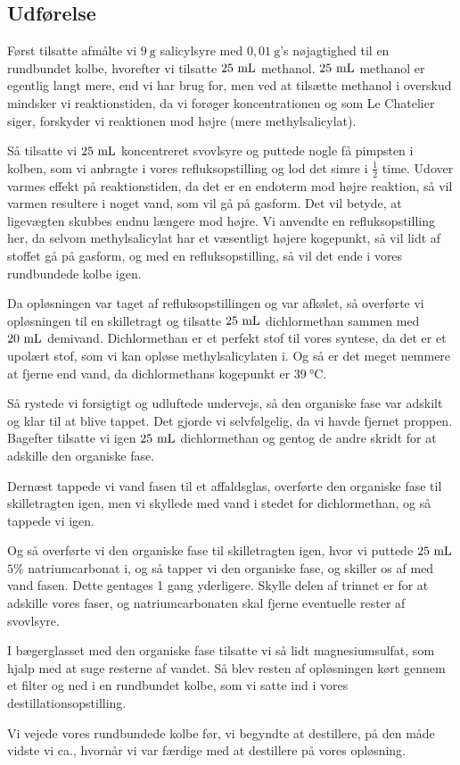 \subsection*{Udførelse}
Først tilsatte afmålte vi $9\ \unit{\gram}$ salicylsyre
med $0{,}01\ \unit{\gram}$'s nøjagtighed til en rundbundet kolbe,
hvorefter vi tilsatte $25\ \ml$ methanol.
$25\ \ml$ methanol er egentlig langt mere, end vi har brug for, men ved at tilsætte methanol 
i overskud mindsker vi reaktionstiden, da vi forøger koncentrationen og som Le Chatelier siger, forskyder vi reaktionen mod højre (mere methylsalicylat).

Så tilsatte vi $25\ \ml$ koncentreret svovlsyre
og puttede nogle få pimpsten i kolben,
som vi anbragte i vores refluksopstilling og lod det simre i $\frac{1}{2}$ time.
Udover varmes effekt på reaktionstiden, da det er en endoterm mod højre reaktion, så vil varmen resultere i noget vand, som 
vil gå på gasform. Det vil betyde, at ligevægten skubbes 
endnu længere mod højre.
Vi anvendte en refluksopstilling her, da selvom methylsalicylat har et væsentligt højere kogepunkt,
så vil lidt af stoffet gå på gasform,
og med en refluksopstilling, så vil det ende i 
vores rundbundede kolbe igen.

Da opløsningen var taget af refluksopstillingen og var afkølet,
så overførte vi opløsningen til en skilletragt og tilsatte
$25\ \ml$ dichlormethan sammen med $20\ \ml$ demivand.
Dichlormethan er et perfekt stof til vores syntese,
da det er et upolært stof, som vi kan opløse methylsalicylaten
i. Og så er det meget nemmere at fjerne end vand,
da dichlormethans kogepunkt er $39\ \unit{\celsius}$.

Så rystede vi forsigtigt og udluftede undervejs,
så den organiske fase var adskilt og klar til at blive tappet.
Det gjorde vi selvfølgelig,
da vi havde fjernet proppen.
Bagefter tilsatte vi igen $25\ \ml$ dichlormethan
og gentog de andre skridt for at adskille
den organiske fase.

Dernæst tappede vi vand fasen til et affaldsglas,
overførte den organiske fase til skilletragten igen,
men vi skyllede med vand i stedet for dichlormethan,
og så tappede vi igen.

Og så overførte vi den organiske fase til skilletragten igen,
hvor vi puttede $25\ \ml$ $5\%$ natriumcarbonat i,
og så tapper vi den organiske fase,
og skiller os af med vand fasen. Dette gentages 1 gang yderligere.
Skylle delen af trinnet er for at adskille vores faser,
og natriumcarbonaten skal fjerne eventuelle rester af svovlsyre.

I bægerglasset med den organiske fase
tilsatte vi så lidt magnesiumsulfat,
som hjalp med at suge resterne af vandet.
Så blev resten af opløsningen kørt gennem et filter
og ned i en rundbundet kolbe,
som vi satte ind i vores destillationsopstilling.

Vi vejede vores rundbundede kolbe før, vi begyndte at destillere,
på den måde vidste vi ca., hvornår vi var færdige
med at destillere på vores opløsning.
